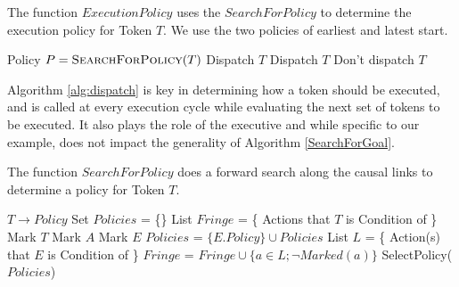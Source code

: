 
\begin{algorithm} [H]
  \caption{\small The function $ExecutionPolicy$ uses the
    $SearchForPolicy$ to determine the execution policy for Token
    $T$. We use the two policies of earliest and latest start.}
  \label{alg:dispatch}
\label{ExecutionPolicy}
\begin{algorithmic}
\small 
{}
\State Policy $P = \textsc{SearchForPolicy}( T )$
	\State \Return Dispatch $T$
	\State \Return Dispatch $T$
\Else
	\State \Return Don't dispatch $T$
\EndIf
\EndFunction
\end{algorithmic}
\end{algorithm}

Algorithm \ref{alg:dispatch} is key in determining how a token should
be executed, and is called at every execution cycle while evaluating
the next set of tokens to be executed. It also plays the role of the
executive and while specific to our example, does not impact the
generality of Algorithm \ref{SearchForGoal}.


\begin{algorithm} [htb]
  \caption{\small The function $SearchForPolicy$ does a forward search
    along the causal links to determine a policy for Token $T$.}
  \label{SearchForGoal}
\begin{algorithmic}
  \small
  \State \Return $T \to Policy$
  \Else 
  \State Set $Policies$ = \{\}
  \State List $Fringe$ = \{ Actions that $T$ is Condition of \}
  \State Mark $T$
  \State Mark $A$
  \State Mark $E$
    \State $Policies$ =  $\{ E.Policy \} \cup Policies$
  \EndIf
  \State List $L$ = \{ Action(s) that $E$ is Condition of \}
  \State $Fringe$ = $Fringe \cup \{a \in L; \neg Marked(a) \}$ 
  \EndFor
  \EndFor
  \State \Return SelectPolicy($Policies$)
  \EndIf
\EndFunction
\end{algorithmic}
\end{algorithm}


